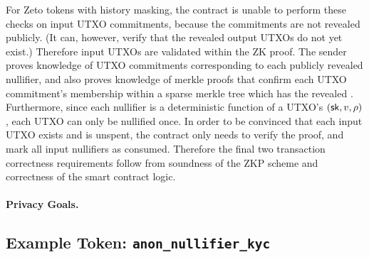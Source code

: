 For Zeto tokens with history masking, the contract is unable to perform these checks on input UTXO commitments, because the commitments are not revealed publicly. (It can, however, verify that the revealed output UTXOs do not yet exist.) Therefore input UTXOs are validated within the ZK proof. The sender proves knowledge of UTXO commitments corresponding to each publicly revealed nullifier, and also proves knowledge of merkle proofs that confirm each UTXO commitment's membership within a sparse merkle tree which has the revealed . Furthermore, since each nullifier is a deterministic function of a UTXO's $(\mathsf{sk}, v, \rho)$, each UTXO can only be nullified once. In order to be convinced that each input UTXO exists and is unspent, the contract only needs to verify the proof, and mark all input nullifiers as consumed. Therefore the final two transaction correctness requirements follow from soundness of the ZKP scheme and correctness of the smart contract logic.

\paragraph{Privacy Goals.} 

\subsection{Example Token: \texttt{anon\_nullifier\_kyc}} %

